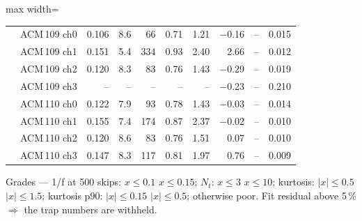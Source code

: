 \begin{table}[H]
\begin{adjustbox}{max width=\linewidth}
\begin{tabular}{llrrrrrrrr}
 & ACM\,109 ch0 & \cellcolor{fair}0.106 & 8.6 & 66 & 0.71 & \cellcolor{good}1.21 & \cellcolor{good}$-$0.16 & -- & \cellcolor{good}0.015\\
 & ACM\,109 ch1 & \cellcolor{poor}0.151 & 5.4 & 334 & 0.93 & \cellcolor{good}2.40 & \cellcolor{poor}2.66 & -- & \cellcolor{good}0.012\\
 & ACM\,109 ch2 & \cellcolor{fair}0.120 & 8.3 & 83 & 0.76 & \cellcolor{good}1.43 & \cellcolor{good}$-$0.29 & -- & \cellcolor{good}0.019\\
 & ACM\,109 ch3 & -- & -- & -- & -- & -- & \cellcolor{good}$-$0.23 & -- & \cellcolor{poor}0.210\\
 & ACM\,110 ch0 & \cellcolor{fair}0.122 & 7.9 & 93 & 0.78 & \cellcolor{good}1.43 & \cellcolor{good}$-$0.03 & -- & \cellcolor{good}0.014\\
 & ACM\,110 ch1 & \cellcolor{poor}0.155 & 7.4 & 174 & 0.87 & \cellcolor{good}2.37 & \cellcolor{good}$-$0.02 & -- & \cellcolor{good}0.010\\
 & ACM\,110 ch2 & \cellcolor{fair}0.120 & 8.6 & 83 & 0.76 & \cellcolor{good}1.51 & \cellcolor{good}0.07 & -- & \cellcolor{good}0.010\\
 & ACM\,110 ch3 & \cellcolor{fair}0.147 & 8.3 & 117 & 0.81 & \cellcolor{good}1.97 & \cellcolor{fair}0.76 & -- & \cellcolor{good}0.009\\
\bottomrule\end{tabular}\end{adjustbox}
\par\smallskip\footnotesize Grades --- 1/f at 500 skips: \colorbox{good}{$x\le0.1$} \colorbox{fair}{$x\le0.15$}; $N_t$: \colorbox{good}{$x\le3$} \colorbox{fair}{$x\le10$}; kurtosis: \colorbox{good}{$|x|\le0.5$} \colorbox{fair}{$|x|\le1.5$}; kurtosis p90: \colorbox{good}{$|x|\le0.15$} \colorbox{fair}{$|x|\le0.5$}; otherwise \colorbox{poor}{poor}. Fit residual above 5\,\% $\Rightarrow$ the trap numbers are withheld.
\end{table}
